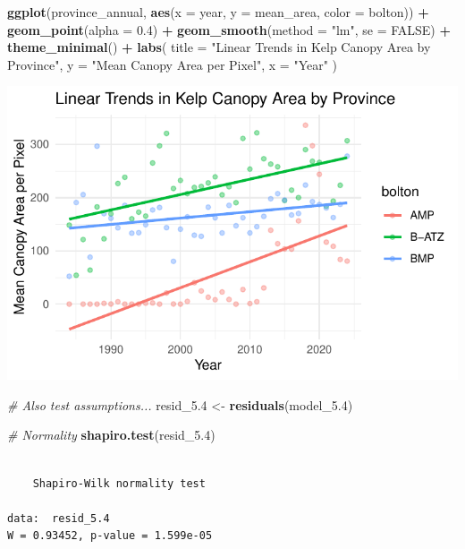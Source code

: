 \documentclass[
  british,
  10pt,
]{article}
\newenvironment{Shaded}{\begin{snugshade}}{\end{snugshade}}
\newcommand{\AttributeTok}[1]{\textcolor[rgb]{0.13,0.29,0.53}{#1}}
\newcommand{\CommentTok}[1]{\textcolor[rgb]{0.56,0.35,0.01}{\textit{#1}}}
\newcommand{\ConstantTok}[1]{\textcolor[rgb]{0.56,0.35,0.01}{#1}}
\newcommand{\FloatTok}[1]{\textcolor[rgb]{0.00,0.00,0.81}{#1}}
\newcommand{\FunctionTok}[1]{\textcolor[rgb]{0.13,0.29,0.53}{\textbf{#1}}}
\newcommand{\NormalTok}[1]{#1}
\newcommand{\OtherTok}[1]{\textcolor[rgb]{0.56,0.35,0.01}{#1}}
\newcommand{\SpecialCharTok}[1]{\textcolor[rgb]{0.81,0.36,0.00}{\textbf{#1}}}
\newcommand{\StringTok}[1]{\textcolor[rgb]{0.31,0.60,0.02}{#1}}
\begin{document}
\begin{Shaded}
\begin{Highlighting}[]
\FunctionTok{ggplot}\NormalTok{(province\_annual,}
       \FunctionTok{aes}\NormalTok{(}\AttributeTok{x =}\NormalTok{ year, }\AttributeTok{y =}\NormalTok{ mean\_area, }\AttributeTok{color =}\NormalTok{ bolton)) }\SpecialCharTok{+}
  \FunctionTok{geom\_point}\NormalTok{(}\AttributeTok{alpha =} \FloatTok{0.4}\NormalTok{) }\SpecialCharTok{+}
  \FunctionTok{geom\_smooth}\NormalTok{(}\AttributeTok{method =} \StringTok{"lm"}\NormalTok{, }\AttributeTok{se =} \ConstantTok{FALSE}\NormalTok{) }\SpecialCharTok{+}
  \FunctionTok{theme\_minimal}\NormalTok{() }\SpecialCharTok{+}
  \FunctionTok{labs}\NormalTok{(}
    \AttributeTok{title =} \StringTok{"Linear Trends in Kelp Canopy Area by Province"}\NormalTok{,}
    \AttributeTok{y =} \StringTok{"Mean Canopy Area per Pixel"}\NormalTok{,}
    \AttributeTok{x =} \StringTok{"Year"}
\NormalTok{  )}
\end{Highlighting}
\end{Shaded}

\begin{center}
\includegraphics[width=0.6\linewidth,height=\textheight,keepaspectratio]{BCB744_Biostats_Prac_Exam_2025_files/figure-pdf/chunk20-1.pdf}
\end{center}

\begin{Shaded}
\begin{Highlighting}[]
\CommentTok{\# Also test assumptions...}
\NormalTok{resid\_5}\FloatTok{.4} \OtherTok{\textless{}{-}} \FunctionTok{residuals}\NormalTok{(model\_5}\FloatTok{.4}\NormalTok{)}

\CommentTok{\# Normality}
\FunctionTok{shapiro.test}\NormalTok{(resid\_5}\FloatTok{.4}\NormalTok{)}
\end{Highlighting}
\end{Shaded}

\begin{verbatim}

    Shapiro-Wilk normality test

data:  resid_5.4
W = 0.93452, p-value = 1.599e-05
\end{verbatim}
\end{document}
